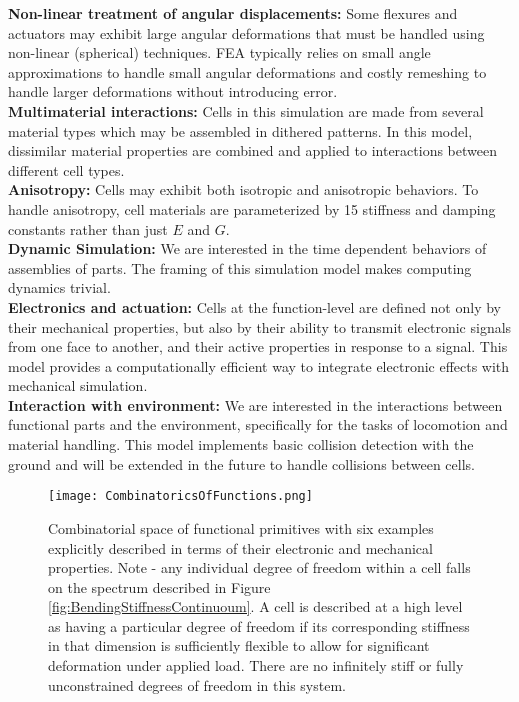 {\textbf{Non-linear treatment of angular displacements:} Some flexures and actuators may exhibit large angular deformations that must be handled using non-linear (spherical) techniques.  FEA typically relies on small angle approximations to handle small angular deformations and costly remeshing to handle larger deformations without introducing error.\\

\textbf{Multimaterial interactions:} Cells in this simulation are made from several material types which may be assembled in dithered patterns.  In this model, dissimilar material properties are combined and applied to interactions between different cell types.\\

\textbf{Anisotropy:} Cells may exhibit both isotropic and anisotropic behaviors.  To handle anisotropy, cell materials are parameterized by 15 stiffness and damping constants rather than just $E$ and $G$.\\

\textbf{Dynamic Simulation:} We are interested in the time dependent behaviors of assemblies of parts.  The framing of this simulation model makes computing dynamics trivial.\\

\textbf{Electronics and actuation:} Cells at the function-level are defined not only by their mechanical properties, but also by their ability to transmit electronic signals from one face to another, and their active properties in response to a signal.  This model provides a computationally efficient way to integrate electronic effects with mechanical simulation. \\

\textbf{Interaction with environment:}  We are interested in the interactions between functional parts and the environment, specifically for the tasks of locomotion and material handling.  This model implements basic collision detection with the ground and will be extended in the future to handle collisions between cells.\\

\begin{figure}
  \texttt{[image: CombinatoricsOfFunctions.png]}
  \caption{Combinatorial space of functional primitives with six examples explicitly described in terms of their electronic and mechanical properties.  Note - any individual degree of freedom within a cell falls on the spectrum described in Figure \ref{fig:BendingStiffnessContinuoum}.  A cell is described at a high level as having a particular degree of freedom if its corresponding stiffness in that dimension is sufficiently flexible to allow for significant deformation under applied load.  There are no infinitely stiff or fully unconstrained degrees of freedom in this system.}
  \label{fig:CombinatoricsOfFunctions}
\end{figure}

}
